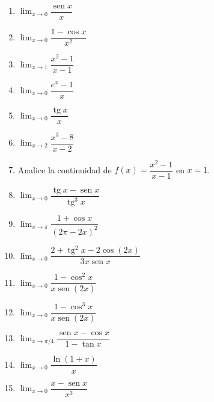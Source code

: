 \documentclass[12pt, letterpaper]{article}
\begin{document}
\begin{enumerate}[leftmargin=*]

  \item \medio{} $\lim_{x\to0}\dfrac{\operatorname{sen} x}{x}$

  \item \medio{} $\lim_{x\to0}\dfrac{1 - \cos x}{x^2}$

  \item \medio{} $\lim_{x\to1}\dfrac{x^2 - 1}{x - 1}$

  \item \medio{} $\lim_{x\to0}\dfrac{e^x - 1}{x}$

  \item \medio{} $\lim_{x\to0}\dfrac{\operatorname{tg} x}{x}$

  \item \medio{} $\lim_{x\to2}\dfrac{x^3 - 8}{x - 2}$

  \item \medio{} Analice la continuidad de $f(x) = \dfrac{x^2 - 1}{x - 1}$ en $x = 1$.

  \item \dificil{} $\lim_{x\to0}\dfrac{\operatorname{tg}x - \operatorname{sen}x}{\operatorname{tg}^3 x}$ %

  \item \dificil{} $\lim_{x\to\pi}\dfrac{1 + \cos x}{(2\pi - 2x)^2}$ %

  \item \dificil{} $\lim_{x\to0}\dfrac{2 + \operatorname{tg}^2 x - 2\cos(2x)}{3x\operatorname{sen}x}$ %

  \item \dificil{} $\lim_{x\to0}\dfrac{1 - \cos^2 x}{x\operatorname{sen}(2x)}$ %

  \item \dificil{} $\lim_{x\to0}\dfrac{1 - \cos^3 x}{x\operatorname{sen}(2x)}$ %

  \item \dificil{} $\lim_{x\to\pi/4}\dfrac{\operatorname{sen}x - \cos x}{1 - \tan x}$ %

  \item \dificil{} $\lim_{x\to0}\dfrac{\ln(1+x)}{x}$

  \item \dificil{} $\lim_{x\to0}\dfrac{x - \operatorname{sen} x}{x^3}$


\end{enumerate}
\end{document}
